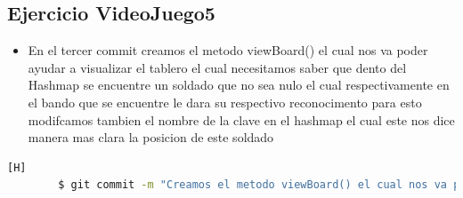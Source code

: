 \documentclass{article}
\begin{document}
	\subsection{Ejercicio VideoJuego5}
	\begin{itemize}	
		\item En el tercer commit creamos el metodo viewBoard() el cual nos va poder ayudar a visualizar el tablero el cual necesitamos saber que dento del Hashmap se encuentre un soldado que no sea nulo el cual respectivamente en el bando que se encuentre le dara su respectivo reconocimento para esto modifcamos tambien el nombre de la clave en el hashmap el cual este nos dice manera mas clara la posicion de este soldado 
	\end{itemize}	
	\begin{lstlisting}[language=bash,caption={Commit}][H]
		$ git commit -m "Creamos el metodo viewBoard() el cual nos va poder ayudar a visualizar el tablero el cual necesitamos saber que dento del Hashmap se encuentre un soldado que no sea nulo el cual respectivamente en el bando que se encuentre le dara su respectivo reconocimento para esto modifcamos tambien el nombre de la clave en el hashmap el cual este nos dice manera mas clara la posicion de este soldado"
	\end{lstlisting}	
\end{document}
